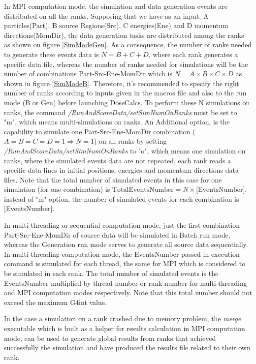 \documentclass[letterpaper,12pt]{article}
\begin{document}
In MPI computation mode, the simulation and data generation events are distributed on all the ranks. Supposing that we have as an input, A particles(Part), B source Regions(Src), C energies(Ene) and D momentum directions(MomDir), the data generation tasks are distributed among the ranks as shown on figure \ref{SimModeGen}. As a consequence, the number of ranks needed to generate these events data is $N=B+C+D$, where each rank generates a specific data file, whereas the number of ranks needed for simulations will be the number of combinations Part-Src-Ene-MomDir which is $N=A\times B\times C\times D$ as shown in figure \ref{SimModeB}. Therefore, it's recommended to specify the right number of ranks according to inputs given in the macros file and also to the run mode (B or Gen) before launching DoseCalcs. To perform these N simulations on ranks, the command \textit{/RunAndScoreData/setSimNumOnRanks} must be set to "m", which means multi-simulations on ranks. An Additional option, is the capability to simulate one Part-Src-Ene-MomDir combination ($A=B=C=D=1 \Rightarrow N=1$) on all ranks by setting \textit{/RunAndScoreData/setSimNumOnRanks} to "o", which means one simulation on ranks, where the simulated events data are not repeated, each rank reads a specific data lines in initial positions, energies and momentum directions data files. Note that the total number of simulated events in this case for one simulation (for one combination) is $\text{TotalEventsNumber}=N\times\text{[EventsNumber]}$, instead of "m" option, the number of simulated events for each combination is [EventsNumber].

In multi-threading or sequential computation mode, just the first combination Part-Src-Ene-MomDir of source data will be simulated in Batch run mode, whereas the Generation run mode serves to generate all source data sequentially. In multi-threading computation mode, the EventsNumber passed in execution command is simulated for each thread, the same for MPI which is considered to be simulated in each rank. The total number of simulated events is the EventsNumber multiplied by thread number or rank number for multi-threading and MPI computation modes respectively. Note that this total number should not exceed the maximum G4int value.

In the case a simulation on a rank crashed due to memory problem, the \textit{merge} executable which is built as a helper for results calculation in MPI computation mode, can be used to generate global results from ranks that achieved successfully the simulation and have produced the results file related to their own rank.
\end{document}
